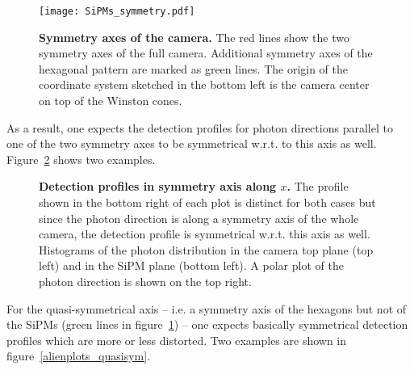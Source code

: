 \begin{figure}[H]
	\centering
	\texttt{[image: SiPMs\_symmetry.pdf]}
	\caption[Symmetry axes of the \iceact camera]{\textbf{Symmetry axes of the \iceact camera.} The red lines show the two symmetry axes of the full camera. Additional symmetry axes of the hexagonal pattern are marked as green lines. The origin of the \geant coordinate system sketched in the bottom left is the camera center on top of the Winston cones.}
	\label{camera:symmetryaxes}
\end{figure}

As a result, one expects the detection profiles for photon directions parallel to one of the two symmetry axes to be symmetrical w.r.t. to this axis as well. Figure~\ref{alienplots_normalsym} shows two examples.\\

\begin{figure}[H]
	\centering
	\begin{subfigure}[t]{0.492\textwidth}
	\end{subfigure}
	\hfill
	\begin{subfigure}[t]{0.492\textwidth}
	\end{subfigure}
	\caption[Detection profiles in symmetry axis along $x$]{\textbf{Detection profiles in symmetry axis along $x$.} The profile shown in the bottom right of each plot is distinct for both cases but since the photon direction is along a symmetry axis of the whole camera, the detection profile is symmetrical w.r.t. this axis as well. Histograms of the photon distribution in the camera top plane (top left) and in the SiPM plane (bottom left). A polar plot of the photon direction is shown on the top right.}
	\label{alienplots_normalsym}
\end{figure}

For the quasi-symmetrical axis -- i.e. a symmetry axis of the hexagons but not of the SiPMs (green lines in figure~\ref{camera:symmetryaxes}) -- one expects basically symmetrical detection profiles which are more or less distorted. Two examples are shown in figure~\ref{alienplots_quasisym}.\\
	
